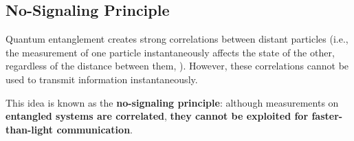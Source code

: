 \subsection{No-Signaling Principle}\label{sec:no-signaling-principle}

Quantum entanglement creates strong correlations between distant particles (i.e., the measurement of one particle instantaneously affects the state of the other, regardless of the distance between them, ). However, these correlations cannot be used to transmit information instantaneously.

\highspace
This idea is known as the \textbf{no-signaling principle}: although measurements on \textbf{entangled systems are correlated}, \textbf{they cannot be exploited for faster-than-light communication}.

